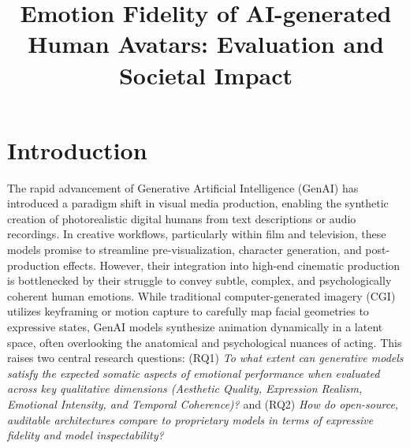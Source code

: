 \documentclass[pdflatex,sn-mathphys-num]{sn-jnl}
\theoremstyle{thmstyleone}
\theoremstyle{thmstyletwo}
\theoremstyle{thmstylethree}
\begin{document}
\title[]{Emotion Fidelity of AI-generated Human Avatars: Evaluation and Societal Impact}

\author*[1]{ }



\maketitle

\section{Introduction}\label{sec1}
The rapid advancement of Generative Artificial Intelligence (GenAI) has introduced a paradigm shift in visual media production, enabling the synthetic creation of photorealistic digital humans from text descriptions or audio recordings. In creative workflows, particularly within film and television, these models promise to streamline pre-visualization, character generation, and post-production effects. However, their integration into high-end cinematic production is bottlenecked by their struggle to convey subtle, complex, and psychologically coherent human emotions. While traditional computer-generated imagery (CGI) utilizes keyframing or motion capture to carefully map facial geometries to expressive states, GenAI models synthesize animation dynamically in a latent space, often overlooking the anatomical and psychological nuances of acting. This raises two central research questions: (RQ1) \textit{To what extent can generative models satisfy the expected somatic aspects of emotional performance when evaluated across key qualitative dimensions (Aesthetic Quality, Expression Realism, Emotional Intensity, and Temporal Coherence)?} and (RQ2) \textit{How do open-source, auditable architectures compare to proprietary models in terms of expressive fidelity and model inspectability?}
\end{document}
